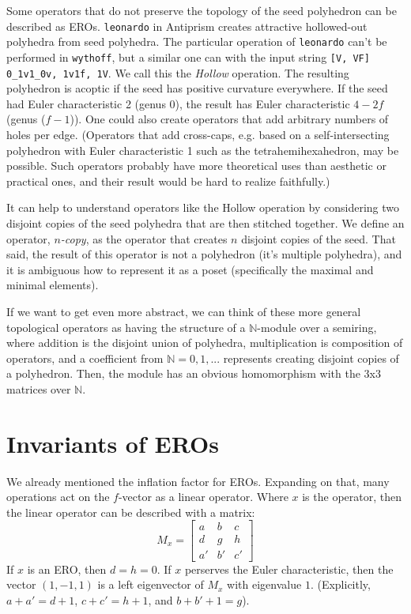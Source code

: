 \documentclass{amsart}[12pt]
\begin{document}
Some operators that do not preserve the topology of the seed polyhedron can be
described as EROs. \texttt{leonardo} in Antiprism creates attractive
hollowed-out polyhedra from seed polyhedra. The particular operation of
\texttt{leonardo} can't be performed in \texttt{wythoff}, but a similar one can
with the input string \texttt{[V, VF] 0\_1v1\_0v, 1v1f, 1V}. We call this the
\textit{Hollow} operation. The resulting polyhedron is acoptic if the seed has
positive curvature everywhere. If the seed had Euler characteristic 2 (genus
0), the result has Euler characteristic $4-2f$ (genus ($f-1$)). One could also
create operators that add arbitrary numbers of holes per edge. (Operators that
add cross-caps, e.g. based on a self-intersecting polyhedron with Euler
characteristic 1 such as the tetrahemihexahedron, may be possible. Such
operators probably have more theoretical uses than aesthetic or practical
ones, and their result would be hard to realize faithfully.)

It can help to understand operators like the Hollow operation by considering
two disjoint copies of the seed polyhedra that are then stitched together. We
define an operator, \textit{$n$-copy}, as the operator that creates $n$
disjoint copies of the seed. That said, the result of this operator is not a
polyhedron (it's multiple polyhedra), and it is ambiguous how to represent it
as a poset (specifically the maximal and minimal elements).

If we want to get even more abstract, we can think of these more general
topological operators as having the structure of a $\mathbb{N}$-module over a
semiring, where addition is the disjoint union of polyhedra, multiplication is
composition of operators, and a coefficient from $\mathbb{N} = {0, 1, ...}$
represents creating disjoint copies of a polyhedron. Then, the module has an
obvious homomorphism with the 3x3 matrices over $\mathbb{N}$.

\section{Invariants of EROs}
We already mentioned the inflation factor for EROs. \cite{brinkmann}
Expanding on that, many operations act on the $f$-vector as a linear operator.
Where $x$ is the operator, then the linear operator can be described with a
matrix:
\begin{equation}
  M_x = \begin{bmatrix}
  a & b & c \\
  d & g & h \\
  a' & b' & c' \end{bmatrix}
\end{equation}
If $x$ is an ERO, then $d = h= 0$. If $x$ perserves the Euler characteristic,
then the vector $(1,-1,1)$ is a left eigenvector of $M_x$ with eigenvalue $1$.
(Explicitly, $a + a' = d + 1$, $c+ c' = h+1$, and $b + b' + 1 = g$).
\end{document}
